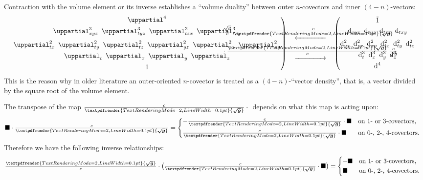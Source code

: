 \documentclass[\ifafour a4paper,12pt,\else a5paper,10pt,\fi%
onecolumn,oneside,article,%
british%
]{memoir}
\theoremstyle{remark}
\theoremstyle{innote}
\renewcommand*{\bm}[1]{\textpdfrender{TextRenderingMode=2,LineWidth=0.1pt}{\boldsymbol{#1}}}
\newcommand*{\de}{\uppartial}%
\newcommand*{\di}{\mathrm{d}}%
\newcommand*{\dotv}{\blacksquare}%
\renewcommand*{\|}[1][]{\nonscript\:#1\vert\nonscript\:\mathopen{}}
\newcommand*{\se}[1]{\de_{#1}}
\newcommand*{\sse}[1]{\de^{2}_{#1}}
\newcommand*{\ssse}[1]{\de^{3}_{#1}}
\newcommand*{\sssse}[1]{\de^{4}_{#1}}
\newcommand*{\tw}[1]{\tilde{#1}}
\newcommand*{\ti}[1]{\di_{#1}}
\newcommand*{\tti}[1]{\di^{2}_{#1}}
\newcommand*{\ttti}[1]{\di^{3}_{#1}}
\newcommand*{\tttti}[1]{\di^{4}_{#1}}
\newcommand*{\dg}{\sqrt{g}}
\newcommand*{\ve}{\tfrac{\bm{\sqrt{g}}}{c}}
\newcommand*{\vi}{\tfrac{c}{\bm{\sqrt{g}}}}
\begin{document}
Contraction with the volume element or its inverse establishes a \enquote{volume duality} between outer $n$-covectors and inner $(4-n)$-vectors:
\begin{equation}
  \label{eq:volume_duality}
  \left.
    \begin{gathered}
      \sssse{}
      \\
  \ssse{xyz}\enspace
  \ssse{tyz}\enspace
  \ssse{tzx}\enspace
  \ssse{txy}
  \\[\jot]
  \sse{tx}\enspace
  \sse{ty}\enspace
  \sse{tz}\enspace
  \sse{yz}\enspace
  \sse{zx}\enspace
  \sse{xy}
  \\
  \se{t}\enspace
  \se{x}\enspace
  \se{y}\enspace
  \se{z}
  \\
  1
\end{gathered}
\right)\quad
\begin{gathered}
  \xleftarrow{\qquad\mathclap{\textstyle\frac{\dg}{c}\,\vi\cdot{}}\qquad}
  \\
  \xrightarrow{\qquad\mathclap{\textstyle{}\cdot\ve\,\frac{c}{\dg}}\qquad}
\end{gathered}
\quad%
\left(
  \begin{gathered}
    \tw{1}
    \\
  \ti{xyz}\enspace
  \ti{tyz}\enspace
  \ti{tzx}\enspace
  \ti{txy}
  \\[\jot]
  \tti{yz}\enspace
  \tti{zx}\enspace
  \tti{xy}\enspace
  \tti{tx}\enspace
  \tti{ty}\enspace
  \tti{tz}
  \\
  \ttti{t}\enspace
  \ttti{x}\enspace
  \ttti{y}\enspace
  \ttti{z}
  \\
  \tttti{}
\end{gathered}
\right.
\end{equation}
This is the reason why in older literature an outer-oriented $n$-covector is treated as a $(4-n)$-\enquote{vector density}, that is, a vector divided by the square root of the volume element.

The transpose of the map $\vi\cdot{}$ depends on what this map is acting upon:
\begin{equation}
  \label{eq:transpose_inv_vol_element}
  \dotv\cdot\vi =
  \begin{dcases*}
    -\vi\cdot\dotv& on 1- or 3-covectors,
    \\
    \vi\cdot\dotv& on 0-, 2-, 4-covectors.
  \end{dcases*}
\end{equation}
Therefore we have the following inverse relationships:
\begin{equation}
  \label{eq:inverse_vol_element}
  \ve\cdot\bigl(\vi\cdot \dotv\bigr) =
  \begin{dcases*}
    -\dotv& on 1- or 3-covectors,
    \\
    \dotv& on 0-, 2-, 4-covectors.
  \end{dcases*}
\end{equation}
\end{document}
